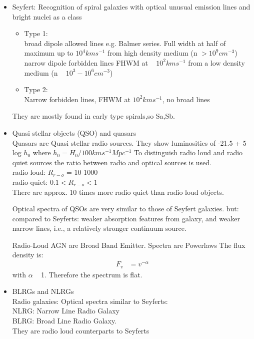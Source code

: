\documentclass[11pt,a4paper]{article}
\begin{document}
\begin{itemize}
    \item Seyfert: 
         Recognition of spiral galaxies with optical unusual emission
lines and bright nuclei as a class
    \begin{itemize}
        \item Type 1: \\ 
            broad dipole allowed lines e.g. Balmer series. Full width at half of maximum up  to $10^4 kms^{-1}$ from high density medium (n $> 10^9 cm^{-3}$)
            narrow dipole forbidden lines FHWM at ~ $10^2 kms^{-1}$ from a low density medium (n ~ $10^3-10^6cm^{-3}$)
        \item Type 2: \\ 
            Narrow forbidden lines, FHWM at $10^2 kms^{-1}$, no broad lines
    \end{itemize}
    They are mostly found in early type spirals,so Sa,Sb.
\item Quasi stellar objects (QSO) and quasars\\ 
    Quasars are Quasi stellar radio sources. 
    They show luminosities of -21.5 + 5 log $h_0$ where $h_0 = H_0/100 kms^{-1} Mpc^{-1}$
    To distinguish radio loud and radio quiet sources the ratio between radio and optical sources is used.\\
    radio-loud: $R_{r-o}$ = 10-1000 \\
radio-quiet: $0.1 < R_{r-o} < 1$ \\
There are approx. 10 times more radio quiet than radio loud objects.

Optical spectra of QSOs are very similar to those of Seyfert galaxies.
but: compared to Seyferts: weaker absorption features from galaxy, and weaker
narrow lines, i.e., a relatively stronger continuum source.

Radio-Loud AGN are Broad
Band Emitter. Spectra are
Powerlaws
The flux density is:
\begin{align*}
    F_v & = v^{-\alpha} 
\end{align*}
with $\alpha$ ~ 1.
Therefore the spectrum is flat. 
\item BLRGs and NLRGs \\  
    Radio galaxies: Optical spectra similar to
Seyferts: \\
NLRG: Narrow Line Radio Galaxy \\
BLRG: Broad Line Radio Galaxy. \\
They are radio loud counterparts to Seyferts


\end{itemize}
\end{document}

